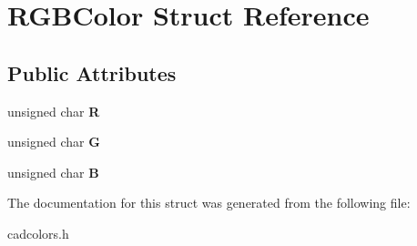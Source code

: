 \hypertarget{struct_r_g_b_color}{}\section{R\+G\+B\+Color Struct Reference}
\label{struct_r_g_b_color}
\subsection*{Public Attributes}
\begin{DoxyCompactItemize}
\item 
unsigned char {\bfseries R}\hypertarget{struct_r_g_b_color_a08dc1314bb6cba7c46eb628cace3a4b3}{}\label{struct_r_g_b_color_a08dc1314bb6cba7c46eb628cace3a4b3}

\item 
unsigned char {\bfseries G}\hypertarget{struct_r_g_b_color_a64d9c7645be2a5c1d74a08e7a818a81a}{}\label{struct_r_g_b_color_a64d9c7645be2a5c1d74a08e7a818a81a}

\item 
unsigned char {\bfseries B}\hypertarget{struct_r_g_b_color_a31daf22abeb5a738953fe69c0df15b93}{}\label{struct_r_g_b_color_a31daf22abeb5a738953fe69c0df15b93}

\end{DoxyCompactItemize}


The documentation for this struct was generated from the following file\+:\begin{DoxyCompactItemize}
\item 
cadcolors.\+h\end{DoxyCompactItemize}
